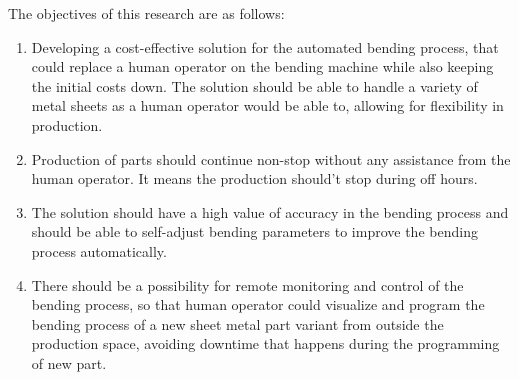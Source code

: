 The objectives of this research are as follows:
\begin{enumerate}
    \item Developing a cost-effective solution for the automated bending process, that could replace a human operator on the bending machine while also keeping the initial costs down. The solution should be able to handle a variety of metal sheets as a human operator would be able to, allowing for flexibility in production.
    \item Production of parts should continue non-stop without any assistance from the human operator. It means the production should't stop during off hours.
    \item The solution should have a high value of accuracy in the bending process and should be able to self-adjust bending parameters to improve the bending process automatically.
    \item There should be a possibility for remote monitoring and control of the bending process, so that human operator could visualize and program the bending process of a new sheet metal part variant from outside the production space, avoiding downtime that happens during the programming of new part.
\end{enumerate}